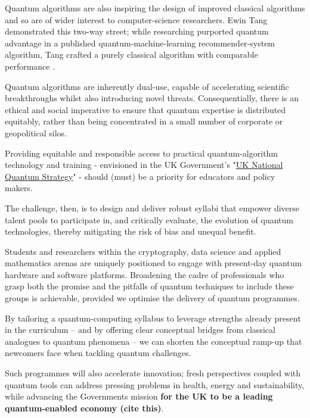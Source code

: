 Quantum algorithms are also inspiring the design of improved classical algorithms 
and so are of wider interest to computer-science researchers.  
Ewin Tang demonstrated this two-way street;
while researching purported quantum advantage in a published quantum‑machine‑learning recommender‑system algorithm,
Tang crafted a purely classical algorithm with comparable performance \cite{Tang:2019}.

Quantum algorithms are inherently dual-use, capable of accelerating scientific breakthroughs whilst also introducing novel threats. 
Consequentially, there is an ethical and social imperative to ensure that quantum expertise is distributed equitably,
rather than being concentrated in a small number of corporate or geopolitical silos.

Providing equitable and responsible access to practical quantum-algorithm technology and training
- envisioned in the UK Government’s "\href{https://www.gov.uk/government/publications/national-quantum-strategy?lang=en-gb}{UK National Quantum Strategy}" -
should (must) be a priority for educators and policy makers. 

The challenge, then, is to design and deliver robust syllabi that empower diverse talent pools to 
participate in, and critically evaluate, the evolution of quantum technologies, 
thereby mitigating the risk of bias and unequal benefit.

Students and researchers within the cryptography, data science and applied mathematics arenas 
are uniquely positioned to engage with present-day quantum hardware and software platforms.
Broadening the cadre of professionals who grasp both the promise and the pitfalls of quantum techniques to include these groups 
is achievable, provided we optimise the delivery of quantum programmes.

By tailoring a quantum-computing syllabus to leverage strengths already present in the curriculum 
-- and by offering clear conceptual bridges from classical analogues to quantum phenomena 
-- 
we can shorten the conceptual ramp-up that newcomers face when tackling quantum challenges.

Such programmes will also accelerate innovation; 
fresh perspectives coupled with quantum tools can address pressing problems in health, energy and sustainability,
while advancing the Governments mission \textbf{for the UK to be a leading quantum-enabled economy (cite this)}.


